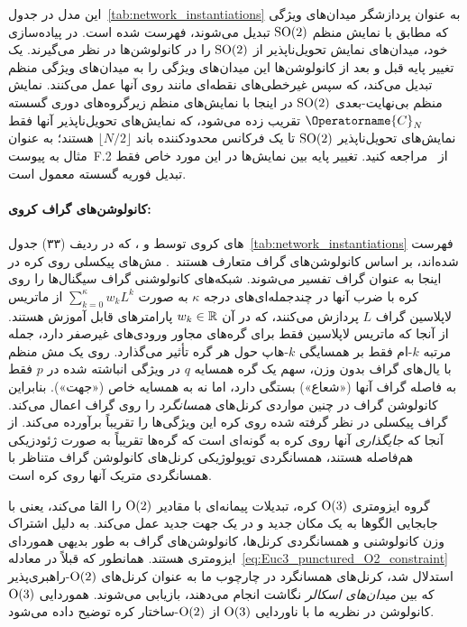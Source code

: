 این مدل در جدول~\ref{tab:network_instantiations} به عنوان پردازشگر میدان‌های ویژگی که مطابق با نمایش منظم $\operatorname{SO}(2)$ تبدیل می‌شوند، فهرست شده است.
در پیاده‌سازی خود، \citet{kicanaoglu2019gaugeSphere} میدان‌های نمایش تحویل‌ناپذیر از $\operatorname{SO}(2)$ را در کانولوشن‌ها در نظر می‌گیرند.
یک تغییر پایه قبل و بعد از کانولوشن‌ها این میدان‌های ویژگی را به میدان‌های ویژگی منظم تبدیل می‌کند، که سپس غیرخطی‌های نقطه‌ای مانند  روی آنها عمل می‌کنند.
نمایش منظم بی‌نهایت-بعدی $\operatorname{SO}(2)$ در اینجا با نمایش‌های منظم زیرگروه‌های دوری گسسته $\Operatorname{C}_N$ تقریب زده می‌شود، که نمایش‌های تحویل‌ناپذیر آنها فقط نمایش‌های تحویل‌ناپذیر $\operatorname{SO}(2)$ تا یک فرکانس محدودکننده باند $\lfloor N/2 \rfloor$ هستند؛ به عنوان مثال به پیوست~F.2 از~\cite{Weiler2019_E2CNN} مراجعه کنید.
تغییر پایه بین نمایش‌ها در این مورد خاص فقط تبدیل فوریه گسسته معمول است.


\paragraph{کانولوشن‌های گراف کروی:}

های کروی توسط \citet{perraudin2018DeepSphere} و \citet{yang2020rotation}، که در ردیف (۳۳) جدول~\ref{tab:network_instantiations} فهرست شده‌اند، بر اساس کانولوشن‌های گراف متعارف هستند~\cite{kipf2016semi}.
مش‌های پیکسلی روی کره در اینجا به عنوان گراف تفسیر می‌شوند.
شبکه‌های کانولوشنی گراف سیگنال‌ها را روی کره با ضرب آنها در چندجمله‌ای‌های درجه $\kappa$ به صورت $\sum_{k=0}^\kappa w_k L^k$ از ماتریس لاپلاسین گراف $L$ پردازش می‌کنند، که در آن $w_k \in \mathbb{R}$ پارامترهای قابل آموزش هستند.
از آنجا که ماتریس لاپلاسین فقط برای گره‌های مجاور ورودی‌های غیرصفر دارد، جمله مرتبه $k$-ام فقط بر همسایگی $k$-هاپ حول هر گره تأثیر می‌گذارد.
روی یک مش منظم با یال‌های گراف بدون وزن، سهم یک گره همسایه $q$ در ویژگی انباشته شده در $p$ فقط به فاصله گراف آنها («شعاع») بستگی دارد، اما نه به همسایه خاص («جهت»).
بنابراین کانولوشن گراف در چنین مواردی کرنل‌های \emph{همسانگرد} را روی گراف اعمال می‌کند.
گراف پیکسلی در نظر گرفته شده روی کره این ویژگی‌ها را تقریباً برآورده می‌کند.
از آنجا که \emph{جایگذاری} آنها روی کره به گونه‌ای است که گره‌ها تقریباً به صورت ژئودزیکی هم‌فاصله هستند، همسانگردی توپولوژیکی کرنل‌های کانولوشن گراف متناظر با همسانگردی متریک آنها روی کره است.


گروه ایزومتری $\operatorname{O}(3)$ کره، تبدیلات پیمانه‌ای با مقادیر $\operatorname{O}(2)$ را القا می‌کند، یعنی با جابجایی الگوها به یک مکان جدید و در یک جهت جدید عمل می‌کند.
به دلیل اشتراک وزن کانولوشنی و همسانگردی کرنل‌ها، کانولوشن‌های گراف به طور بدیهی هموردای ایزومتری هستند.
همانطور که قبلاً در معادله~\eqref{eq:Euc3_punctured_O2_constraint} استدلال شد، کرنل‌های همسانگرد در چارچوب ما به عنوان کرنل‌های $\operatorname{O}(2)$-راهبری‌پذیر که بین \emph{میدان‌های اسکالر} نگاشت انجام می‌دهند، بازیابی می‌شوند.
هموردایی $\operatorname{O}(3)$ کانولوشن در نظریه ما با ناوردایی $\operatorname{O}(3)$ از $\operatorname{O}(2)$-ساختار کره توضیح داده می‌شود.


